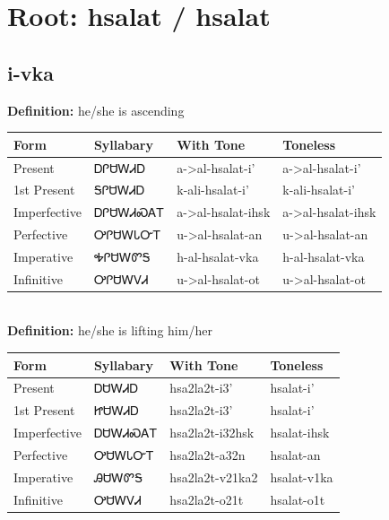 \documentclass{article}%
\begin{document}
%
\normalsize%
\section*{Root: hsalat / hsalat}%
\subsection*{i-vka}%
\textbf{Definition: }%
he/she is ascending%
\\[0.5em]%
\begin{tabular}{|l|l|l|l|}%
\hline%
\textbf{Form}&\textbf{Syllabary}&\textbf{With Tone}&\textbf{Toneless}\\%
\hline%
Present&ᎠᎵᏌᎳᏗᎠ&a{-}>al{-}hsalat{-}i'&a{-}>al{-}hsalat{-}i'\\%
1st Present&ᎦᎵᏌᎳᏗᎠ&k{-}ali{-}hsalat{-}i'&k{-}ali{-}hsalat{-}i'\\%
Imperfective&ᎠᎵᏌᎳᏗᏍᎪᎢ&a{-}>al{-}hsalat{-}ihsk&a{-}>al{-}hsalat{-}ihsk\\%
Perfective&ᎤᎵᏌᎳᏓᏅᎢ&u{-}>al{-}hsalat{-}an&u{-}>al{-}hsalat{-}an\\%
Imperative&ᎭᎵᏌᎳᏛᎦ&h{-}al{-}hsalat{-}vka&h{-}al{-}hsalat{-}vka\\%
Infinitive&ᎤᎵᏌᎳᏙᏗ&u{-}>al{-}hsalat{-}ot&u{-}>al{-}hsalat{-}ot\\%
\hline%
\end{tabular}%
\\[1em]%
\textbf{Definition: }%
he/she is lifting him/her%
\\[0.5em]%
\begin{tabular}{|l|l|l|l|}%
\hline%
\textbf{Form}&\textbf{Syllabary}&\textbf{With Tone}&\textbf{Toneless}\\%
\hline%
Present&ᎠᏌᎳᏗᎠ&hsa2la2t{-}i3'&hsalat{-}i'\\%
1st Present&ᏥᏌᎳᏗᎠ&hsa2la2t{-}i3'&hsalat{-}i'\\%
Imperfective&ᎠᏌᎳᏗᏍᎪᎢ&hsa2la2t{-}i32hsk&hsalat{-}ihsk\\%
Perfective&ᎤᏌᎳᏓᏅᎢ&hsa2la2t{-}a32n&hsalat{-}an\\%
Imperative&ᎯᏌᎳᏛᎦ&hsa2la2t{-}v21ka2&hsalat{-}v1ka\\%
Infinitive&ᎤᏌᎳᏙᏗ&hsa2la2t{-}o21t&hsalat{-}o1t\\%
\hline%
\end{tabular}%
\\[1em]%
\end{document}
